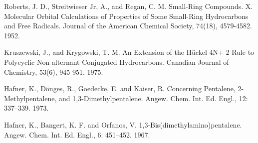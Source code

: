 \documentclass[12pt]{article}
\begin{document}
\begin{thebibliography}{abrv}
 Roberts, J. D., Streitwieser Jr, A., and Regan, C. M. Small-Ring Compounds. X. Molecular Orbital Calculations of Properties of Some Small-Ring Hydrocarbons and Free Radicals. Journal of the American Chemical Society, 74(18), 4579-4582. 1952.

 Kruszewski, J., and Krygowski, T. M. An Extension of the Hückel 4N+ 2 Rule to Polycyclic Non-alternant Conjugated Hydrocarbons. Canadian Journal of Chemistry, 53(6), 945-951. 1975.

 Hafner, K., Dönges, R., Goedecke, E. and Kaiser, R. Concerning Pentalene, 2-Methylpentalene, and 1,3-Dimethylpentalene. Angew. Chem. Int. Ed. Engl., 12: 337–339. 1973.

 Hafner, K., Bangert, K. F. and Orfanos, V. 1,3-Bis(dimethylamino)pentalene. Angew. Chem. Int. Ed. Engl., 6: 451–452. 1967.

\end{thebibliography}
\end{document}
